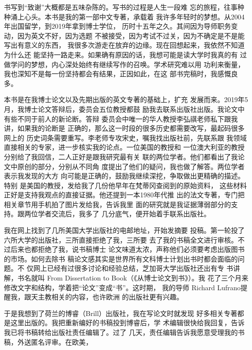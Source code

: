 \par
书写到“致谢”大概都是五味杂陈的。写书的过程是人生一段难%
忘的旅程，往事种种涌上心头。本书是我的第一部中文专著，承载着%
我许多年轻时的梦想。从2004年出国留学，到2019年拿到博士学位，%
历时十五年之久。其间因为导师职务变动，因为英文不好，因为选题%
不被接受，因为考试不过关，因为不确定是不是能写出有意义的东西，%
我很多次游走在放弃的边缘。现在回想起来，我依然不知道为什么还%
能坚持一路走来。如果确有原因的话，我想可能是读大学时我真的有%
过做学问的梦想，内心深处始终有继续写作的召唤。学术研究难以用%
功利来衡量，我也深知不是每一份坚持都会有结果，正因如此，在这%
部书完稿时，我感慨良多。%
\par
本书是在我博士论文以及先期出版的英文专著的基础上，扩充%
发展而来。2019年5月，我博士论文答辩后，委员会五位教授都鼓%
励我去联系出版社出版。我论文中有些不同于前人的新论断。答辩%
委员会中唯一的华人教授李弘祺老师私下跟我讲，如果我的论断是%
正确的，那么这一时段的很多历史都需要改写，最起码很多网上的%
历史词条需要重写。李老师专攻宋史，嘱我找出版社前，先联系跟%
我领域直接相关的专家，进一步核实我的论点。一位美国的教授和%
一位澳大利亚的教授分别给了我回信，二人正好是跟我研究最有关%
联的两位学者。他们都看出了我论文中原创的部分，分别从不同角%
度提出了他们的疑问，我也做了解答。两位学者表示我发现的大方%
向可能是正确的，鼓励我继续深挖，争取做出更精确的描述。特别%
是美国的教授，发给我了几份他早年在梵蒂冈查阅到的原始资料，%
这些材料正好是支持我观点的直接证据。他还提到一本1980年代推%
出的法文专著，专门把相关章节用手机拍了图片发给我，告诉我里%
面的研究就是我证据薄弱部分的支持。跟两位学者交流后，我多了%
几分底气，便开始着手联系出版社。%
\par
我在网上找到了几所美国大学出版社的电邮地址，开始发摘要%
投稿。第一轮投了六所大学的出版社，三所直接拒绝了我，三所要%
去了我的书稿全文进行审核。不过后来也都拒绝了我，说书稿博士%
论文味道太浓，声称他们必须要考虑出版图书的市场。如何去除书%
稿论文感其实是世界所有文科博士计划出书时都会面临的问题。不%
仅网上已经有过很多讨论和经验总结，芝加哥大学出版社还出有专%
书讲解，书名就叫 From Dissertation to Book（《从博士论文到书》）。我%
花了三个月来修改文字和结构，学着把“论文”变成“书”。这时期，%
我的导师 Richard Lufrano提醒我，跟天主教相关的内容，也许欧洲%
的出版社更有兴趣。%
\par
于是我想到了荷兰的博睿（Brill）出版社，我在写论文时就发现%
好多相关专著都是这里出版的。我把重新编好的书稿投到博睿后，学%
术编辑很快给我回复，告诉我已将书稿转给出版社责任编辑了。过了%
几天，责任编辑告诉我愿意受理我的书稿，外送匿名评审。在欧美，%
